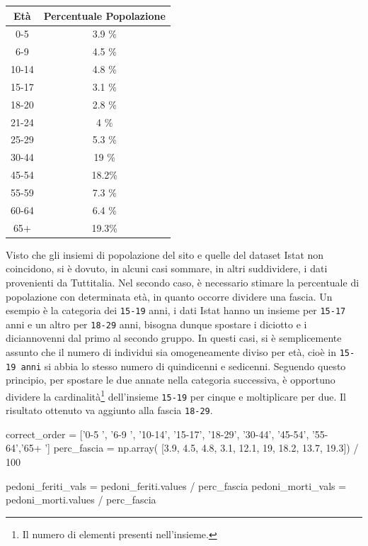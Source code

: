 \documentclass[a4paper,12pt]{report}
\newcommand{\columnstyle}[1]{\texttt{#1}}
\begin{document}
\begin{center}
    \def\arraystretch{1.5}%
    \begin{tabular}{ |c|c| } 
    \hline
    Età & Percentuale Popolazione \\ 
    \hline
    \rowcolor{TableGray}
    0-5     & 3.9 \% \\ 
    6-9     & 4.5 \% \\
    \rowcolor{TableGray}
    10-14   & 4.8 \% \\
    15-17   & 3.1 \% \\
    \rowcolor{TableGray}
    18-20   & 2.8 \% \\ 
    21-24   & 4   \% \\
    \rowcolor{TableGray}
    25-29   & 5.3 \% \\
    30-44   & 19  \% \\
    \rowcolor{TableGray}
    45-54   & 18.2\% \\ 
    55-59   & 7.3 \% \\
    \rowcolor{TableGray}
    60-64   & 6.4 \% \\
    65$+$   & 19.3\% \\
    \hline
    \end{tabular}
\end{center}

Visto che gli insiemi di popolazione del sito e quelle del dataset Istat non coincidono, 
si è dovuto, in alcuni casi sommare, in altri suddividere, 
i dati provenienti da Tuttitalia.
Nel secondo caso, è necessario stimare la percentuale di popolazione con 
determinata età, in quanto occorre dividere una fascia.
Un esempio è la categoria dei \columnstyle{15-19} anni, 
i dati Istat hanno un insieme per \columnstyle{15-17} anni e un altro per 
\columnstyle{18-29} anni, 
bisogna dunque spostare i diciotto e i diciannovenni dal primo al 
secondo gruppo. 
In questi casi, si è semplicemente assunto che il numero di individui sia omogeneamente 
diviso per età, cioè in \columnstyle{15-19 anni} si abbia lo stesso numero di 
quindicenni e sedicenni.
Seguendo questo principio, per spostare le due annate nella categoria successiva, 
è opportuno dividere la cardinalità\footnote{Il numero di elementi presenti nell'insieme.} 
dell'insieme \columnstyle{15-19} per cinque e moltiplicare per due. 
Il risultato ottenuto va aggiunto alla fascia \columnstyle{18-29}.

\begin{code}
correct_order =         ['0-5  ', '6-9  ', '10-14', '15-17', '18-29', '30-44', '45-54', '55-64','65+  ']
perc_fascia = np.array( [3.9, 4.5, 4.8, 3.1, 12.1, 19, 18.2, 13.7, 19.3]) / 100

pedoni_feriti_vals = pedoni_feriti.values / perc_fascia
pedoni_morti_vals = pedoni_morti.values / perc_fascia
\end{code}
\end{document}
